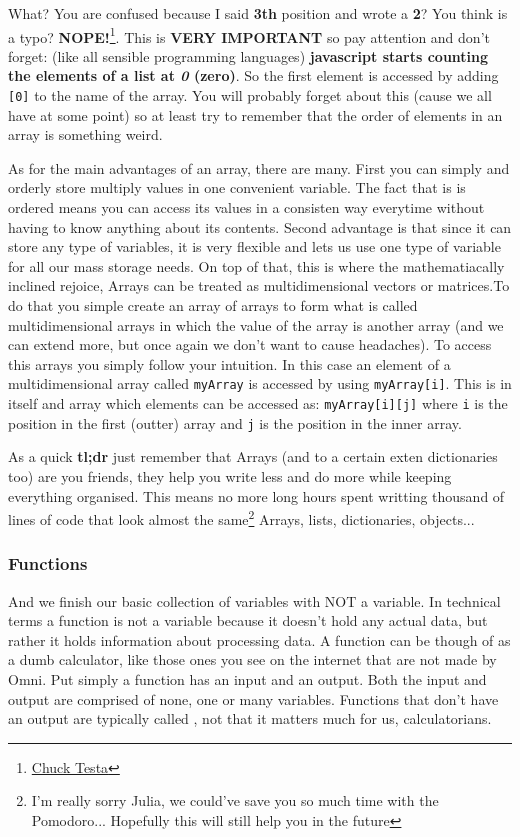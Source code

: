 What? You are confused because I said \textbf{3th} position and wrote a \textbf{2}? You think is a typo? \textbf{NOPE!}\footnote{\href{https://www.youtube.com/watch?v=LJP1DphOWPs}{Chuck Testa}}. This is \textbf{VERY IMPORTANT} so pay attention and don't forget: (like all sensible programming languages) \textbf{javascript  starts counting the elements of a list at \textit{0} (zero)}. So the first element is accessed by adding \texttt{[0]} to the name of the array. You will probably forget about this (cause we all have at some point) so at least try to remember that the order of elements in an array is something weird.

As for the main advantages of an array, there are many. First you can simply and orderly store multiply values in one convenient variable. The fact that is is ordered means you can access its values in a consisten way everytime without having to know anything about its contents. Second advantage is that since it can store any type of variables, it is very flexible and lets us use one type of variable for all our mass storage needs. On top of that, this is where the mathematiacally inclined rejoice, Arrays can be treated as multidimensional vectors or matrices.To do that you simple create an array of arrays to form what is called multidimensional arrays in which the value of the array is another array (and we can extend more, but once again we don't want to cause headaches). To access this arrays you simply follow your intuition. In this case an element of a multidimensional array called \texttt{myArray} is accessed by using \texttt{myArray[i]}. This is in itself and array which elements can be accessed as: \texttt{myArray[i][j]} where \texttt{i} is the position in the first (outter) array and \texttt{j} is the position in the inner array.

As a quick \large{\textbf{tl;dr}} just remember that Arrays (and to a certain exten dictionaries too) are you friends, they help you write less and do more while keeping everything organised. This means no more long hours spent writting thousand of lines of code that look almost the same\footnote{I'm really sorry Julia, we could've save you so much time with the Pomodoro... Hopefully this will still help you in the future}
Arrays, lists, dictionaries, objects...
\subsubsection{Functions}
\label{subsub:functions}

And we finish our basic collection of variables with NOT a variable. In technical terms a function is not a variable because it doesn't hold any actual data, but rather it holds information about processing data. A function can be though of as a dumb calculator, like those ones you see on the internet that are not made by Omni. Put simply a function has an input and an output. Both the input and output are comprised of none, one or many variables. Functions that don't have an output are typically called , not that it matters much for us, calculatorians.

